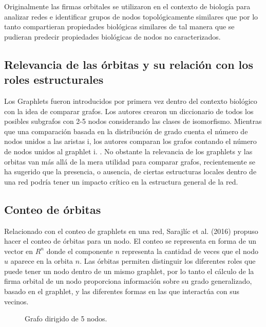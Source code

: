 Originalmente las firmas orbitales se utilizaron en el contexto de biología para analizar redes e identificar grupos de nodos topológicamente similares que por lo tanto compartieran propiedades biológicas similares \cite{milenkovic_uncovering_2008} de tal manera que se pudieran predecir propiedades biológicas de nodos no caracterizados.

\subsection{Relevancia de las órbitas y su relación con los roles estructurales}

Los Graphlets fueron introducidos por primera vez dentro del contexto biológico con la idea de comparar grafos. Los autores crearon un diccionario de todos los posibles subgrafos con 2-5 nodos considerando las clases de isomorfismo. Mientras que una comparación basada en la distribución de grado cuenta el número de nodos unidos a las aristas i, los autores comparan los grafos contando el número de nodos unidos al graphlet i. \citep{sarajlic_graphlet-based_2016}. No obstante la relevancia de los graphlets y las orbitas van más allá de la mera utilidad para comparar grafos, recientemente se ha sugerido que la presencia, o ausencia, de ciertas estructuras locales dentro de una red podría tener un impacto crítico en la estructura general de la red.

\subsection{Conteo de órbitas}

Relacionado con el conteo de graphlets en una red, Sarajlíc et al. (2016) \cite{sarajlic_graphlet-based_2016} propuso hacer el conteo de órbitas para un nodo. El conteo se representa en forma de un vector en ${R}^{n}$ donde el componente $n$ representa la cantidad de veces que el nodo $u$ aparece en la orbita $n$. Las órbitas permiten distinguir los diferentes roles que puede tener un nodo dentro de un mismo graphlet, por lo tanto el cálculo de la firma orbital de un nodo proporciona información sobre su grado generalizado, basado en el graphlet, y las diferentes formas en las que interactúa con sus vecinos. 

 \begin{figure}[htbp]
  \centering
  
    \caption{Grafo dirigido de 5 nodos.}
    \label{fig:examplecount}
\end{figure}


